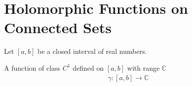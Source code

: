 \section{Holomorphic Functions on Connected Sets}

Let $[a, b]$ be a closed interval of real numbers.

\begin{defn}
    A function of class $C^1$ defined on $[a, b]$ with range $\mathbb{C}$
    \begin{align*}
        \gamma : [a, b] \to \mathbb{C} \\
    \end{align*}
\end{defn}
